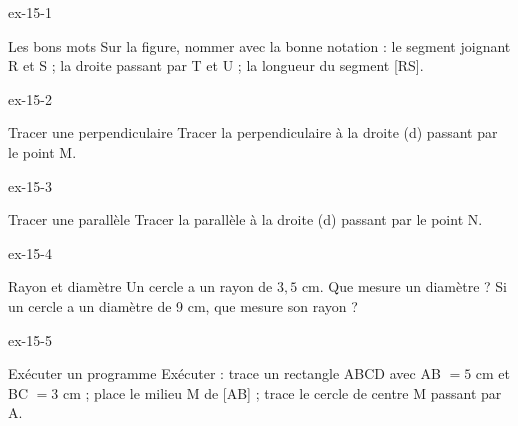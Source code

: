 \clearpage{}
\begin{blocLivre}{ex-15-1}\begin{exercice}[1]{Les bons mots}
Sur la figure, nommer avec la bonne notation : le segment joignant R et S ; la droite passant par T et U ; la longueur du segment [RS].
\label{fig-ex-15-1}
\end{exercice}\end{blocLivre}
\begin{blocLivre}{ex-15-2}\begin{exercice}[1]{Tracer une perpendiculaire}
Tracer la perpendiculaire à la droite (d) passant par le point M.
\label{fig-ex-15-2}
\end{exercice}\end{blocLivre}
\begin{blocLivre}{ex-15-3}\begin{exercice}[1]{Tracer une parallèle}
Tracer la parallèle à la droite (d) passant par le point N.
\label{fig-ex-15-3}
\end{exercice}\end{blocLivre}
\begin{blocLivre}{ex-15-4}\begin{exercice}[1]{Rayon et diamètre}
Un cercle a un rayon de $3{,}5$ cm. Que mesure un diamètre ? Si un cercle a un diamètre de 9 cm, que mesure son rayon ?
\label{fig-ex-15-4}
\end{exercice}\end{blocLivre}
\begin{blocLivre}{ex-15-5}\begin{exercice}[1]{Exécuter un programme}
Exécuter : trace un rectangle ABCD avec AB $=5$ cm et BC $=3$ cm ; place le milieu M de [AB] ; trace le cercle de centre M passant par A.
\label{fig-ex-15-5}
\end{exercice}\end{blocLivre}

